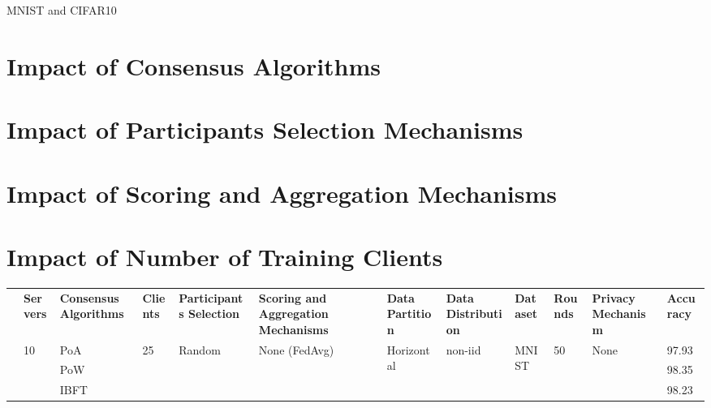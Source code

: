 MNIST \cite{lecun2010mnist} and CIFAR10 \cite{Krizhevsky09learningmultiple}


\section{Impact of Consensus Algorithms}

\section{Impact of Participants Selection Mechanisms}

\section{Impact of Scoring and Aggregation Mechanisms}

\section{Impact of Number of Training Clients}




\begin{landscape}

\begin{table}[]
\begin{tabular}{lllllllllllll}
                  & \textbf{ Servers} & \textbf{Consensus Algorithms} & \textbf{Clients} & \textbf{Participants Selection} & \textbf{Scoring and Aggregation Mechanisms} & \textbf{Data Partition}     & \textbf{Data Distribution} & \textbf{Dataset}       & \textbf{Rounds}     & \multicolumn{2}{l}{\textbf{Privacy Mechanism}} & \textbf{Accuracy} \\
\multirow{3}{*}{} & \multirow{3}{*}{10}        & PoA                           & \multirow{3}{*}{25}       & \multirow{3}{*}{Random}         & \multirow{3}{*}{None (FedAvg)}              & \multirow{3}{*}{Horizontal} & \multirow{3}{*}{non-iid}   & \multirow{3}{*}{MNIST} & \multirow{3}{*}{50} & \multicolumn{2}{l}{\multirow{3}{*}{None}}      & 97.93             \\
                  &                            & PoW                           &                           &                                 &                                             &                             &                            &                        &                     & \multicolumn{2}{l}{}                           & 98.35             \\
                  &                            & IBFT                          &                           &                                 &                                             &                             &                            &                        &                     & \multicolumn{2}{l}{}                           & 98.23            
\end{tabular}
\end{table}


\end{landscape}